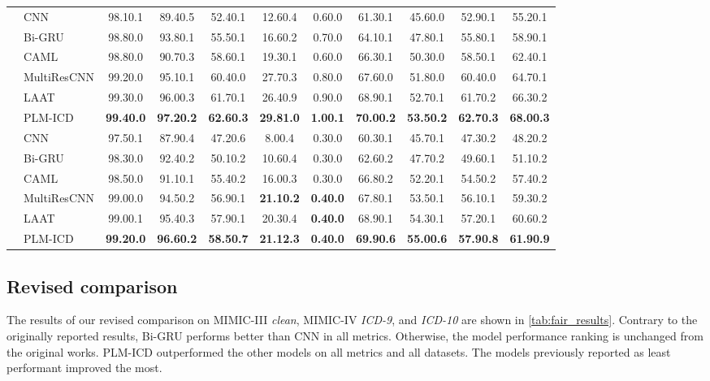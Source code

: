 \documentclass[anonymous=false, sigconf=true, review=false, natbib=true]{acmart}
\begin{document}
\begin{table*}[t]
\begin{tabular}{llccccccccc}
        \hline
         & CNN  & 98.10.1 & 89.40.5 & 52.40.1 & 12.60.4 & 0.60.0 & 61.30.1 & 45.60.0 & 52.90.1 & 55.20.1 \\
        & Bi-GRU  & 98.80.0 & 93.80.1 & 55.50.1 & 16.60.2 & 0.70.0 & 64.10.1 & 47.80.1 & 55.80.1 & 58.90.1 \\
        & CAML & 98.80.0 & 90.70.3 & 58.60.1 & 19.30.1 & 0.60.0 & 66.30.1 & 50.30.0 & 58.50.1 & 62.40.1 \\
        & MultiResCNN  & 99.20.0 & 95.10.1 & 60.40.0 & 27.70.3 & 0.80.0 & 67.60.0 & 51.80.0 & 60.40.0 & 64.70.1 \\
        & LAAT  & 99.30.0 & 96.00.3 & 61.70.1 & 26.40.9 & 0.90.0 & 68.90.1 & 52.70.1 & 61.70.2 & 66.30.2 \\
        & PLM-ICD  & \bfseries 99.40.0 & \bfseries 97.20.2 & \bfseries 62.60.3 & \bfseries 29.81.0 & \bfseries 1.00.1 & \bfseries 70.00.2 & \bfseries 53.50.2 & \bfseries 62.70.3 & \bfseries 68.00.3 \\
        \hline
         & CNN & 97.50.1 & 87.90.4 & 47.20.6 & 8.00.4 & 0.30.0 & 60.30.1 & 45.70.1 & 47.30.2 & 48.20.2 \\
        & Bi-GRU  & 98.30.0 & 92.40.2 & 50.10.2 & 10.60.4 & 0.30.0 & 62.60.2 & 47.70.2 & 49.60.1 & 51.10.2 \\
        & CAML  & 98.50.0 & 91.10.1 & 55.40.2 & 16.00.3 & 0.30.0 & 66.80.2 & 52.20.1 & 54.50.2 & 57.40.2 \\
        & MultiResCNN  & 99.00.0 & 94.50.2 & 56.90.1 & \bfseries 21.10.2 & \bfseries 0.40.0 & 67.80.1 & 53.50.1 & 56.10.1 & 59.30.2 \\
        & LAAT  & 99.00.1 & 95.40.3 & 57.90.1 & 20.30.4 & \bfseries 0.40.0 & 68.90.1 & 54.30.1 & 57.20.1 & 60.60.2 \\
        & PLM-ICD   & \bfseries 99.20.0 & \bfseries 96.60.2 & \bfseries 58.50.7 & \bfseries 21.12.3 & \bfseries 0.40.0 & \bfseries 69.90.6 & \bfseries 55.00.6 & \bfseries 57.90.8 & \bfseries 61.90.9 \\
        
        \bottomrule
    \end{tabular}
\end{table*}


\subsection{Revised comparison}
The results of our revised comparison on MIMIC-III \textit{clean}, MIMIC-IV \textit{ICD-9}, and \textit{ICD-10} are shown in \cref{tab:fair_results}. Contrary to the originally reported results, Bi-GRU performs better than CNN in all metrics. Otherwise, the model performance ranking is unchanged from the original works. PLM-ICD outperformed the other models on all metrics and all datasets. The models previously reported as least performant improved the most. 
\end{document}
